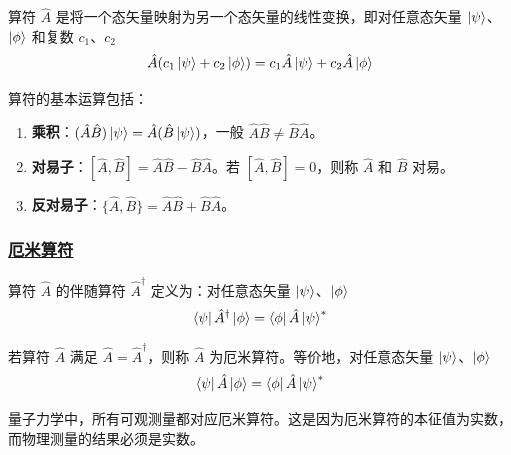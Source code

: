 \begin{definition}[线性算符]
    算符 $\hat{A}$ 是将一个态矢量映射为另一个态矢量的线性变换，即对任意态矢量 $\ket{\psi}$、$\ket{\phi}$ 和复数 $c_1$、$c_2$
    \begin{equation}
        \hat{A}(c_1\ket{\psi} + c_2\ket{\phi}) = c_1\hat{A}\ket{\psi} + c_2\hat{A}\ket{\phi}
    \end{equation}
\end{definition}

算符的基本运算包括：
\begin{enumerate}
    \item \textbf{乘积}：$(\hat{A}\hat{B})\ket{\psi} = \hat{A}(\hat{B}\ket{\psi})$，一般 $\hat{A}\hat{B} \neq \hat{B}\hat{A}$。
    \item \textbf{对易子}：$[\hat{A}, \hat{B}] = \hat{A}\hat{B} - \hat{B}\hat{A}$。若 $[\hat{A}, \hat{B}] = 0$，则称 $\hat{A}$ 和 $\hat{B}$ 对易。
    \item \textbf{反对易子}：$\{\hat{A}, \hat{B}\} = \hat{A}\hat{B} + \hat{B}\hat{A}$。
\end{enumerate}

\subsubsection{\protect\hyperlink{:}{厄米算符}}

\begin{definition}
    算符 $\hat{A}$ 的伴随算符 $\hat{A}^\dagger$ 定义为：对任意态矢量 $\ket{\psi}$、$\ket{\phi}$
    \begin{equation}
        \bra{\psi}\hat{A}^\dagger\ket{\phi} = \bra{\phi}\hat{A}\ket{\psi}^*
    \end{equation}
\end{definition}

\begin{definition}
    若算符 $\hat{A}$ 满足 $\hat{A} = \hat{A}^\dagger$，则称 $\hat{A}$ 为厄米算符。等价地，对任意态矢量 $\ket{\psi}$、$\ket{\phi}$
    \begin{equation}
        \bra{\psi}\hat{A}\ket{\phi} = \bra{\phi}\hat{A}\ket{\psi}^*
    \end{equation}
\end{definition}

\begin{remark}
    量子力学中，所有可观测量都对应厄米算符。这是因为厄米算符的本征值为实数，而物理测量的结果必须是实数。
\end{remark}

